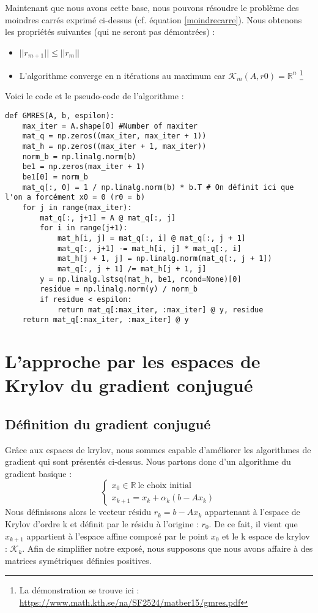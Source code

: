 Maintenant que nous avons cette base, nous pouvons résoudre le problème des moindres carrés exprimé ci-dessus (cf. équation \ref{moindrecarre}). Nous obtenons les propriétés suivantes (qui ne seront pas démontrées)  : 
\begin{itemize}
	\item $||r_{m+1}|| \leq ||r_m||$
	\item L'algorithme converge en n itérations au maximum car $\mathcal{K}_m(A, r0) = \mathbb{R}^n$ \footnote{La démonstration se trouve ici : \url{https://www.math.kth.se/na/SF2524/matber15/gmres.pdf}}
\end{itemize}
Voici le code et le pseudo-code de l'algorithme : 
\begin{verbatim}
def GMRES(A, b, espilon):
	max_iter = A.shape[0] #Number of maxiter
	mat_q = np.zeros((max_iter, max_iter + 1))
	mat_h = np.zeros((max_iter + 1, max_iter))
	norm_b = np.linalg.norm(b)
	be1 = np.zeros(max_iter + 1)
	be1[0] = norm_b
	mat_q[:, 0] = 1 / np.linalg.norm(b) * b.T # On définit ici que l'on a forcément x0 = 0 (r0 = b)
	for j in range(max_iter):
		mat_q[:, j+1] = A @ mat_q[:, j]
		for i in range(j+1):
			mat_h[i, j] = mat_q[:, i] @ mat_q[:, j + 1]
			mat_q[:, j+1] -= mat_h[i, j] * mat_q[:, i]
			mat_h[j + 1, j] = np.linalg.norm(mat_q[:, j + 1])
			mat_q[:, j + 1] /= mat_h[j + 1, j]
		y = np.linalg.lstsq(mat_h, be1, rcond=None)[0]
		residue = np.linalg.norm(y) / norm_b
		if residue < espilon:
			return mat_q[:max_iter, :max_iter] @ y, residue
	return mat_q[:max_iter, :max_iter] @ y
\end{verbatim}

\section{L'approche par les espaces de Krylov du gradient conjugué}
\subsection{Définition du gradient conjugué}
Grâce aux espaces de krylov, nous sommes capable d'améliorer les algorithmes de gradient qui sont présentés ci-dessus. Nous partons donc d'un algorithme du gradient basique : 
\begin{equation}
\begin{cases}
	x_0 \in \mathbb{R} \ \text{le choix initial}\\
	x_{k+1} = x_k + \alpha_k (b - Ax_k)
\end{cases}
\end{equation}
Nous définissons alors le vecteur résidu $r_k = b - Ax_k$ appartenant à l'espace de Krylov d'ordre k et définit par le résidu à l'origine : $r_0$. De ce fait, il vient que $x_{k+1}$ appartient à l'espace affine composé par le point $x_0$ et le k espace de krylov : $\mathcal{K}_k$. Afin de simplifier notre exposé, nous supposons que nous avons affaire à des matrices symétriques définies positives. \\

